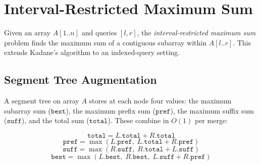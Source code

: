 \section{Interval-Restricted Maximum Sum}
\label{sec:interval-max-sum}

Given an array $A[1..n]$ and queries $[l, r]$, the \emph{interval-restricted maximum sum} problem finds the maximum sum of a contiguous subarray within $A[l..r]$. This extends Kadane's algorithm to an indexed-query setting.

\subsection{Segment Tree Augmentation}

A segment tree on array $A$ stores at each node four values: the maximum subarray sum ($\texttt{best}$), the maximum prefix sum ($\texttt{pref}$), the maximum suffix sum ($\texttt{suff}$), and the total sum ($\texttt{total}$). These combine in $O(1)$ per merge:

\[
\texttt{total} = L.\texttt{total} + R.\texttt{total}
\]
\[
\texttt{pref} = \max(L.\texttt{pref},\; L.\texttt{total} + R.\texttt{pref})
\]
\[
\texttt{suff} = \max(R.\texttt{suff},\; R.\texttt{total} + L.\texttt{suff})
\]
\[
\texttt{best} = \max(L.\texttt{best},\; R.\texttt{best},\;
L.\texttt{suff} + R.\texttt{pref})
\]

